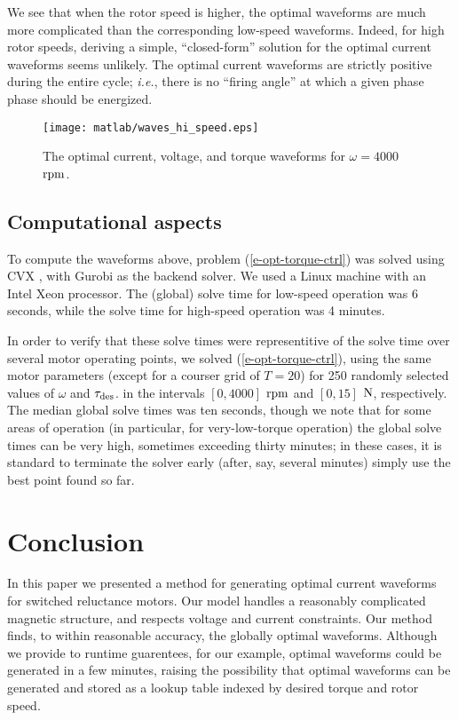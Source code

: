 \documentclass[11pt]{article}
\newcommand{\ie}{{\it i.e.}}
\newif\ifarxiv
\begin{document}
We see that when the rotor speed is higher, 
the optimal waveforms are much more complicated
than the corresponding low-speed waveforms.
Indeed, for high rotor speeds,
deriving a simple, ``closed-form'' solution
for the optimal current waveforms seems unlikely.
The optimal current waveforms are strictly positive
during the entire cycle;
\ie, there is no ``firing angle''
at which a given phase phase should be energized.

\begin{figure} 
\begin{center}
\ifarxiv
\texttt{[image: waves\_hi\_speed.eps]}
\else
\texttt{[image: matlab/waves\_hi\_speed.eps]}
\fi
\caption{
The optimal current, voltage, and torque waveforms for
$\omega = 4000$ $\rm rpm$.
}
\label{f-waves-hi-speed}
\end{center}
\end{figure}


\subsection{Computational aspects}
To compute the waveforms above,
problem (\ref{e-opt-torque-ctrl}) was solved 
using CVX \cite{cvx, gb08},
with Gurobi as the backend solver.
We used a Linux machine with an Intel Xeon processor.
The (global) solve time for low-speed operation was 6 seconds,
while the solve time for high-speed operation was 4 minutes.


In order to verify that these solve times were representitive
of the solve time over several motor operating points,
we solved (\ref{e-opt-torque-ctrl}), 
using the same motor parameters 
(except for a courser grid of $T = 20$)
for 250 randomly selected values of $\omega$ and $\tau_{\rm des}$.
in the intervals $[0, 4000]$ $\rm rpm$ and $[0, 15]$ $\rm N$, respectively.
The median global solve times was ten seconds,
though we note that for some areas of operation
(in particular, for very-low-torque operation)
the global solve times can be very high, sometimes exceeding thirty minutes;
in these cases, it is standard to terminate the solver early
(after, say, several minutes)
simply use the best point found so far.










\section{Conclusion}
In this paper we presented a method for generating optimal current waveforms
for switched reluctance motors.
Our model handles a reasonably complicated magnetic structure,
and respects voltage and current constraints.
Our method finds, to within reasonable accuracy,
the globally optimal waveforms.
Although we provide to runtime guarentees,
for our example, optimal waveforms could be generated in a few minutes,
raising the possibility that optimal waveforms can be generated
and stored as a lookup table indexed by desired torque and rotor speed.


\newpage

\end{document}
